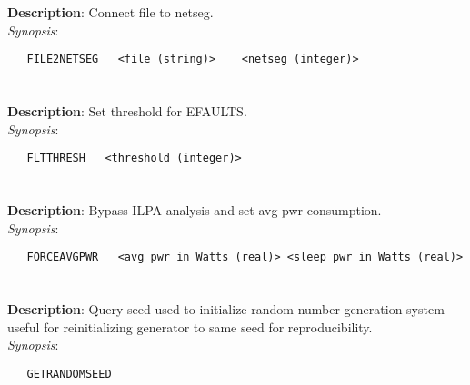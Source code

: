 \section{\quad{}}
\label{manpages:FILE2NETSEG}
\label{manpages:file2netseg}
\vspace{-0.1in}
{\bf Description}: 	Connect file to netseg.\\[1.5ex]
{\em Synopsis}:
\vspace{-0.05in}
\scriptsize
\begin{lstlisting}
   FILE2NETSEG   <file (string)>	<netseg (integer)>																		
\end{lstlisting}
\normalsize
\vspace{-0.05in}


\section{\quad{}}
\label{manpages:FLTTHRESH}
\label{manpages:fltthresh}
\vspace{-0.1in}
{\bf Description}: 	Set threshold for EFAULTS.\\[1.5ex]
{\em Synopsis}:
\vspace{-0.05in}
\scriptsize
\begin{lstlisting}
   FLTTHRESH   <threshold (integer)>								
\end{lstlisting}
\normalsize
\vspace{-0.05in}


\section{\quad{}}
\label{manpages:FORCEAVGPWR}
\label{manpages:forceavgpwr}
\vspace{-0.1in}
{\bf Description}: 	Bypass ILPA analysis and set avg pwr consumption.\\[1.5ex]
{\em Synopsis}:
\vspace{-0.05in}
\scriptsize
\begin{lstlisting}
   FORCEAVGPWR   <avg pwr in Watts (real)> <sleep pwr in Watts (real)>													
\end{lstlisting}
\normalsize
\vspace{-0.05in}


\section{\quad{}}
\label{manpages:GETRANDOMSEED}
\label{manpages:getrandomseed}
\vspace{-0.1in}
{\bf Description}: 	Query seed used to initialize random number generation system useful for reinitializing generator to same seed for reproducibility.\\[1.5ex]
{\em Synopsis}:
\vspace{-0.05in}
\scriptsize
\begin{lstlisting}
   GETRANDOMSEED   								
\end{lstlisting}
\normalsize
\vspace{-0.05in}


